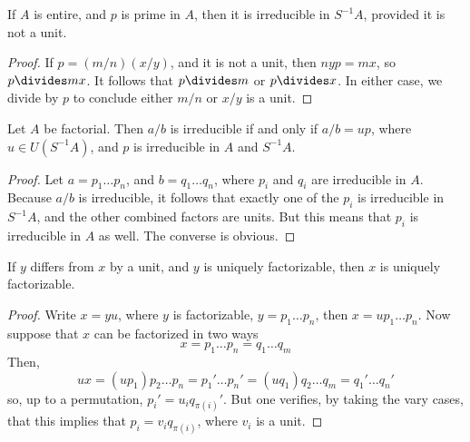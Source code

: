 \begin{lemma}
    If $A$ is entire, and $p$ is prime in $A$, then it is irreducible in $S^{-1}A$, provided it is not a unit.
\end{lemma}
\begin{proof}
    If $p = (m/n)(x/y)$, and it is not a unit, then $nyp = mx$, so $p \divides mx$. It follows that $p \divides m$ or $p \divides x$. In either case, we divide by $p$ to conclude either $m/n$ or $x/y$ is a unit.
\end{proof}

\begin{lemma}
    Let $A$ be factorial. Then $a/b$ is irreducible if and only if $a/b = up$, where $u \in U(S^{-1}A)$, and $p$ is irreducible in $A$ and $S^{-1}A$.
\end{lemma}
\begin{proof}
     Let $a = p_1 \dots p_n$, and $b = q_1 \dots q_n$, where $p_i$ and $q_i$ are irreducible in $A$. Because $a/b$ is irreducible, it follows that exactly one of the $p_i$ is irreducible in $S^{-1}A$, and the other combined factors are units. But this means that $p_i$ is irreducible in $A$ as well. The converse is obvious.
\end{proof}

\begin{lemma}
    If $y$ differs from $x$ by a unit, and $y$ is uniquely factorizable, then $x$ is uniquely factorizable.
\end{lemma}
\begin{proof}
    Write $x = yu$, where $y$ is factorizable, $y = p_1 \dots p_n$, then $x = u p_1 \dots p_n$. Now suppose that $x$ can be factorized in two ways
    \[ x = p_1 \dots p_n = q_1 \dots q_m \]
    Then,
    \[ ux = (up_1) p_2 \dots p_n = p_1' \dots p_n' = (uq_1) q_2 \dots q_m = q_1' \dots q_n' \]
    so, up to a permutation, $p_i' = u_i q_{\pi(i)}'$. But one verifies, by taking the vary cases, that this implies that $p_i = v_i q_{\pi(i)}$, where $v_i$ is a unit.
\end{proof}

